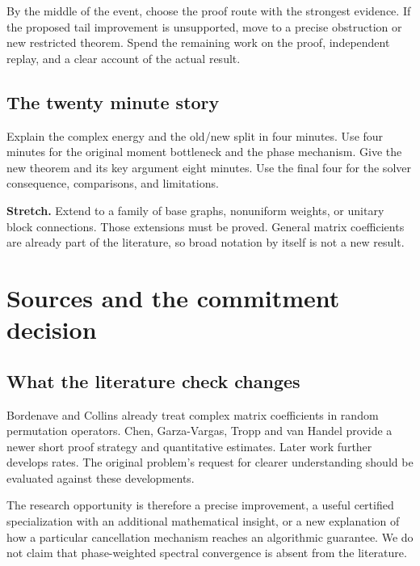 \documentclass[11pt,letterpaper]{article}
\newcommand{\Page}[1]{\clearpage\section*{#1}}
\newcommand{\Sub}[1]{\subsection*{#1}}
\begin{document}
By the middle of the event, choose the proof route with the strongest evidence. If the proposed tail improvement is unsupported, move to a precise obstruction or new restricted theorem. Spend the remaining work on the proof, independent replay, and a clear account of the actual result.

\Sub{The twenty minute story}
Explain the complex energy and the old/new split in four minutes. Use four minutes for the original moment bottleneck and the phase mechanism. Give the new theorem and its key argument eight minutes. Use the final four for the solver consequence, comparisons, and limitations.

\textbf{Stretch.} Extend to a family of base graphs, nonuniform weights, or unitary block connections. Those extensions must be proved. General matrix coefficients are already part of the literature, so broad notation by itself is not a new result.

\Page{Sources and the commitment decision}

\Sub{What the literature check changes}
Bordenave and Collins already treat complex matrix coefficients in random permutation operators. Chen, Garza-Vargas, Tropp and van Handel provide a newer short proof strategy and quantitative estimates. Later work further develops rates. The original problem's request for clearer understanding should be evaluated against these developments.

The research opportunity is therefore a precise improvement, a useful certified specialization with an additional mathematical insight, or a new explanation of how a particular cancellation mechanism reaches an algorithmic guarantee. We do not claim that phase-weighted spectral convergence is absent from the literature.
\end{document}
